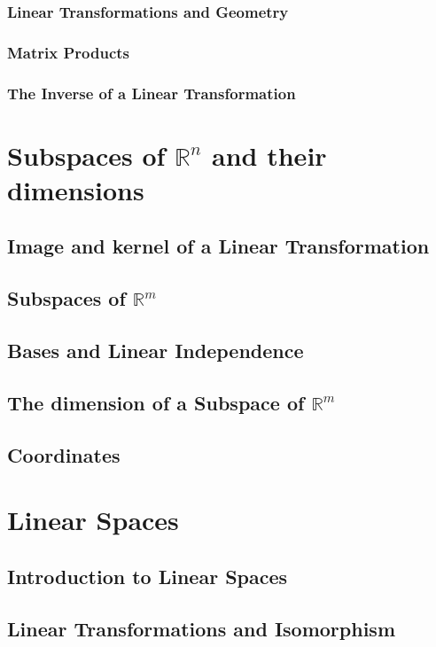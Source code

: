 \documentclass{article}
\theoremstyle{definition}
\begin{document}
\subsubsection{Linear Transformations and Geometry}
\subsubsection{Matrix Products}
\subsubsection{The Inverse of a Linear Transformation}

\newpage

\section{Subspaces of $\mathbb{R}^n$ and their dimensions}
\subsection{Image and kernel of a Linear Transformation}
\subsection{Subspaces of $\mathbb{R}^m$}
\subsection{Bases and Linear Independence}
\subsection{The dimension of a Subspace of $\mathbb{R}^m$}
\subsection{Coordinates}

\newpage

\section{Linear Spaces}
\subsection{Introduction to Linear Spaces}
\subsection{Linear Transformations and Isomorphism}
\end{document}
